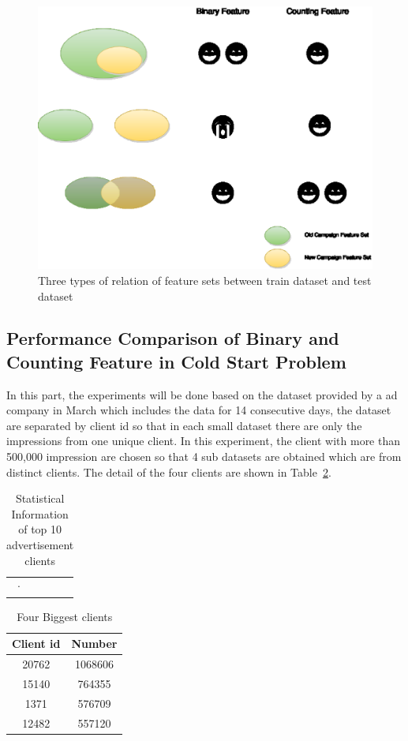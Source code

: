 \documentclass{sig-alternate}
\begin{document}
\begin{figure}[h]
\centering
\includegraphics[width=\columnwidth]{Datasetbias.eps}
\caption{Three types of relation of feature sets between train dataset and test dataset}
\label{fig:datasetbias}
\end{figure}

\subsection{Performance Comparison of Binary and Counting Feature in Cold Start Problem}

In this part, the experiments will be done based on the dataset provided by a ad company in March which includes the data for 14 consecutive days, the dataset are separated by client id so that in each small dataset there are only the impressions from one unique client. In this experiment, the client with more than 500,000 impression are chosen so that 4 sub datasets are obtained which are from distinct clients. The detail of the four clients are shown in Table~\ref{tab:campainid}.


\begin{table}[t]
\centering
\begin{tabular}{c | c | c | c }
· 
\end{tabular}
\caption{Statistical Information of top 10 advertisement clients}
\label{tab:campainid}
\end{table}

\iffalse
\begin{table}[t]
 \centering
 \begin{tabular}{ ||c c || } 
 \hline
 Client id  & Number \\
 \hline
 20762 & 1068606 \\ 
  15140 & 764355 \\ 
   1371 & 576709 \\ 
   12482 & 557120\\
 \hline
 \end{tabular}
 \caption{Four Biggest clients}
 \label{tab:campainid}
 \end{table}
 
\end{document}
